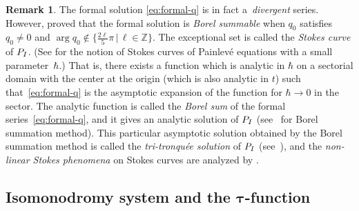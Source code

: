 \documentclass[11pt]{article}
\theoremstyle{definition}
\newtheorem{rem}[thm]{Remark}
\numberwithin{equation}{section}
\def\PI{P_{\rm I}}
\begin{document}
\begin{rem}\sloppy
The formal solution \eqref{eq:formal-q} is in fact a~{\em divergent} series.
However, \cite[Theo\-rem~1.1]{Kamimoto-Koike} proved that
the formal solution is {\em Borel summable} when
$q_{0}$ satisf\/ies $q_{0} \ne 0$ and
\mbox{$\arg q_{0} \notin \{ \frac{2\ell}{5}\pi \,|\,
\ell \in {\mathbb Z} \}$}.
The exceptional set is called the {\em Stokes curve} of $\PI$.
(See \cite[Def\/ini\-tion~2.1]{KT-PI} for the notion of
Stokes curves of Painlev\'e equations
with a small parameter~$\hbar$.)
That is, there exists a function
which is analytic in $\hbar$ on a sectorial domain
with the center at the origin (which is also analytic in $t$)
such that~\eqref{eq:formal-q} is the asymptotic expansion
of the function for $\hbar \rightarrow 0$ in the sector.
The analytic function is called the {\em Borel sum}
of the formal series~\eqref{eq:formal-q}, and
it gives an analytic solution of $\PI$
(see~\cite{Costin08} for Borel summation method).
This particular asymptotic solution obtained by
the Borel summation method is called
the {\em tri-tronqu\'ee solution}
of $\PI$ (see~\cite{Joshi-Kitaev}), and the
{\em non-linear Stokes phenomena} on Stokes curves
are analyzed by \cite{FIKN, Kap, Takei}.
\end{rem}

\subsection[Isomonodromy system and the $\tau$-function]{Isomonodromy system and the $\boldsymbol{\tau}$-function}
\end{document}
